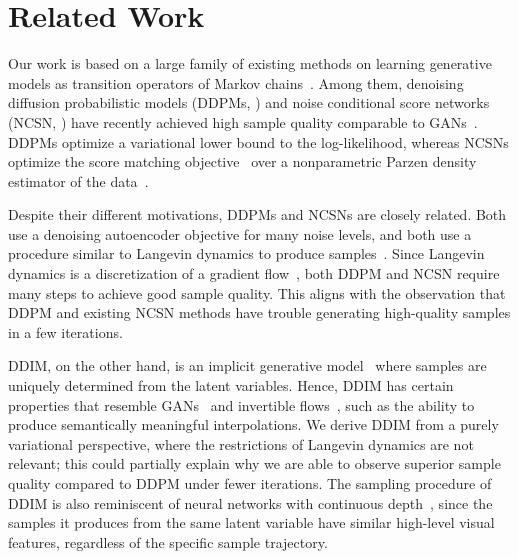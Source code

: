 \section{Related Work}
Our work is based on a large family of existing methods on learning generative models as transition operators of Markov chains~\citep{sohl-dickstein2015deep,bengio2014deep,salimans2014markov,song2017a,goyal2017variational,levy2017generalizing}. Among them, denoising diffusion probabilistic models (DDPMs, \citet{ho2020denoising}) and noise conditional score networks (NCSN, \citet{song2019generative,song2020improved}) have recently achieved high sample quality comparable to GANs~\citep{brock2018large,karras2018a}. DDPMs optimize a variational lower bound to the log-likelihood, whereas NCSNs optimize the score matching objective~\citep{h2005estimation} over a nonparametric Parzen density estimator of the data~\citep{vincent2011connection,raphan2011least}. 

Despite their different motivations, DDPMs and NCSNs are closely related. Both use a denoising autoencoder objective for many noise levels, and both use a procedure similar to Langevin dynamics to produce samples~\citep{neal2011mcmc}. Since Langevin dynamics is a discretization of a gradient flow~\citep{jordan1998variational}, %
both DDPM and NCSN require many steps to achieve good sample quality. %
This aligns with the observation that DDPM and existing NCSN methods have trouble generating high-quality samples in a few iterations.

DDIM, on the other hand, is an implicit generative model~\citep{mohamed2016learning} where samples are uniquely determined from the latent variables. Hence, DDIM has certain properties that resemble GANs~\citep{goodfellow2014generative} and invertible flows~\citep{dinh2016density}, such as the ability to produce semantically meaningful interpolations. We derive DDIM from a purely variational perspective, where the restrictions of Langevin dynamics are not relevant; this could partially explain why we are able to observe superior sample quality compared to DDPM under fewer iterations. %
The sampling procedure of DDIM is also reminiscent of neural networks with continuous depth~\citep{chen2018neural,grathwohl2018ffjord}, since the samples it produces from the same latent variable have similar high-level visual features, regardless of the specific sample trajectory.


